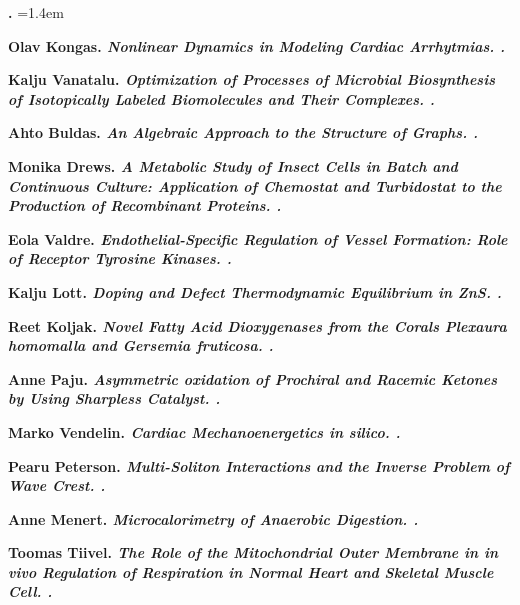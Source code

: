 
\begin{list}
{\textbf{.}}
{\leftmargin=1.4em}
\setlength{\itemsep}{0cm}
\setlength{\parskip}{0pt}
\setlength{\parsep}{0pt}

\item \bf Olav Kongas. \it Nonlinear Dynamics in Modeling Cardiac Arrhytmias. .

\item \bf Kalju Vanatalu. \it Optimization of Processes of Microbial
  Biosynthesis of Isotopically Labeled Biomolecules and Their
  Complexes. .

\item \bf Ahto Buldas. \it An Algebraic Approach to the Structure of
  Graphs. .

\item \bf Monika Drews. \it A Metabolic Study of Insect Cells in Batch and
  Continuous Culture: Application of Chemostat and Turbidostat to the
  Production of Recombinant Proteins. .

\item \bf Eola Valdre. \it Endothelial-Specific Regulation of Vessel
  Formation: Role of Receptor Tyrosine Kinases. .

\item \bf Kalju Lott. \it Doping and Defect Thermodynamic Equilibrium in
  ZnS. .

\item \bf Reet Koljak. \it Novel Fatty Acid Dioxygenases from the Corals
  Plexaura homomalla and Gersemia fruticosa. .

\item \bf Anne Paju. \it Asymmetric oxidation of Prochiral and Racemic Ketones
  by Using Sharpless Catalyst. .

\item \bf Marko Vendelin. \it Cardiac Mechanoenergetics in silico. .

\item \bf Pearu Peterson. \it Multi-Soliton Interactions and the Inverse
  Problem of Wave Crest. .

\item \bf Anne Menert. \it Microcalorimetry of Anaerobic Digestion. .

\item \bf Toomas Tiivel. \it The Role of the Mitochondrial Outer Membrane in
  in vivo Regulation of Respiration in Normal Heart and Skeletal
  Muscle Cell. .


\end{list}
